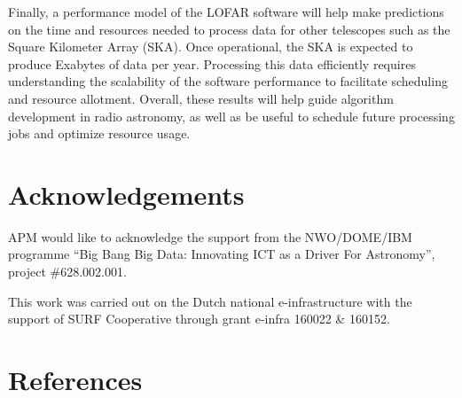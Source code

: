 \documentclass[preprint,5p]{elsarticle}
\begin{document}
Finally, a performance model of the LOFAR software will help make predictions on the time and resources needed to process data for other telescopes such as the Square Kilometer Array (SKA). Once operational, the SKA is expected to produce Exabytes of data per year. Processing this data efficiently requires understanding the scalability of the software performance to facilitate scheduling and resource allotment. Overall, these results will help guide algorithm development in radio astronomy, as well as be useful to schedule future processing jobs and optimize resource usage. 




\section*{Acknowledgements}
APM would like to acknowledge the support from the NWO/DOME/IBM programme ``Big Bang Big Data: Innovating ICT as a Driver For Astronomy'', project \#628.002.001.

This work was carried out on the Dutch national e-infrastructure with the support of SURF
Cooperative through grant e-infra 160022 \& 160152.

\section*{References}

\end{document}
